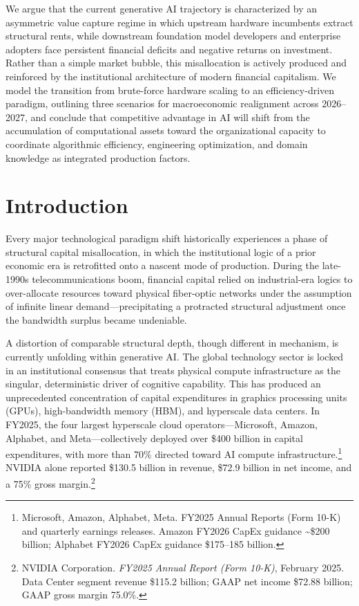 \documentclass[11pt,letterpaper]{article}
\begin{document}
We argue that the current generative AI trajectory is characterized by an asymmetric value capture regime in which upstream hardware incumbents extract structural rents, while downstream foundation model developers and enterprise adopters face persistent financial deficits and negative returns on investment. Rather than a simple market bubble, this misallocation is actively produced and reinforced by the institutional architecture of modern financial capitalism. We model the transition from brute-force hardware scaling to an efficiency-driven paradigm, outlining three scenarios for macroeconomic realignment across 2026--2027, and conclude that competitive advantage in AI will shift from the accumulation of computational assets toward the organizational capacity to coordinate algorithmic efficiency, engineering optimization, and domain knowledge as integrated production factors.

\newpage

\section{Introduction}

Every major technological paradigm shift historically experiences a phase of structural capital misallocation, in which the institutional logic of a prior economic era is retrofitted onto a nascent mode of production. During the late-1990s telecommunications boom, financial capital relied on industrial-era logics to over-allocate resources toward physical fiber-optic networks under the assumption of infinite linear demand---precipitating a protracted structural adjustment once the bandwidth surplus became undeniable.

A distortion of comparable structural depth, though different in mechanism, is currently unfolding within generative AI. The global technology sector is locked in an institutional consensus that treats physical compute infrastructure as the singular, deterministic driver of cognitive capability. This has produced an unprecedented concentration of capital expenditures in graphics processing units (GPUs), high-bandwidth memory (HBM), and hyperscale data centers. In FY2025, the four largest hyperscale cloud operators---Microsoft, Amazon, Alphabet, and Meta---collectively deployed over \$400 billion in capital expenditures, with more than 70\% directed toward AI compute infrastructure.\footnote{Microsoft, Amazon, Alphabet, Meta. FY2025 Annual Reports (Form 10-K) and quarterly earnings releases. Amazon FY2026 CapEx guidance \textasciitilde\$200 billion; Alphabet FY2026 CapEx guidance \$175--185 billion.} NVIDIA alone reported \$130.5 billion in revenue, \$72.9 billion in net income, and a 75\% gross margin.\footnote{NVIDIA Corporation. \textit{FY2025 Annual Report (Form 10-K)}, February 2025. Data Center segment revenue \$115.2 billion; GAAP net income \$72.88 billion; GAAP gross margin 75.0\%.}
\end{document}

